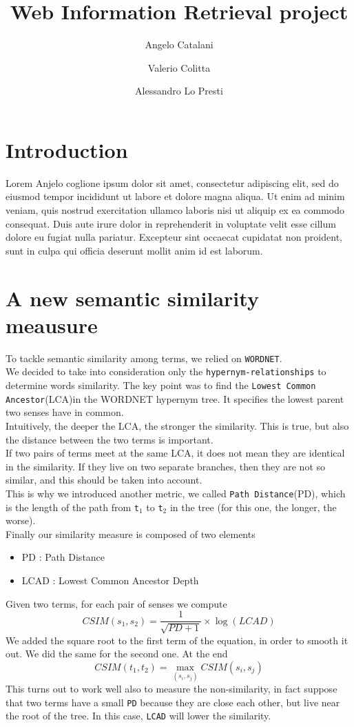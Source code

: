 \documentclass[jou,apacite]{apa6}
\title{Web Information Retrieval project}
\author[1]{Angelo Catalani}
\author[2]{Valerio Colitta}
\author[3]{Alessandro Lo Presti}
\affil[1]{La Sapienza University of Rome}
\affil[2]{La Sapienza University of Rome}
\affil[3]{La Sapienza University of Rome}
\begin{document}
   


\section{Introduction}
Lorem Anjelo coglione ipsum dolor sit amet, consectetur adipiscing elit, sed do eiusmod tempor incididunt ut labore et dolore magna aliqua. Ut enim ad minim veniam, quis nostrud exercitation ullamco laboris nisi ut aliquip ex ea commodo consequat. Duis aute irure dolor in reprehenderit in voluptate velit esse cillum dolore eu fugiat nulla pariatur. Excepteur sint occaecat cupidatat non proident, sunt in culpa qui officia deserunt mollit anim id est laborum.
\section{A new semantic similarity meausure}
To tackle semantic similarity among terms, we relied on \texttt{WORDNET}.\\
We decided to take into consideration only the \texttt{hypernym-relationships} to determine words similarity. The key point was to find the \texttt{Lowest Common Ancestor}(LCA)in the WORDNET hypernym tree. It specifies the lowest parent two senses have in common.\\
Intuitively, the deeper the LCA, the stronger the similarity. This is true, but also the distance between the two terms is important.\\
If two pairs of terms meet at the same LCA, it does not mean they are identical in the similarity. If they live on two separate branches, then they are not so similar, and this should be taken into account.\\
This is why we introduced another metric, we called \texttt{Path Distance}(PD), which is the length of the path from \texttt{t$_1$} to \texttt{t$_2$} in the tree (for this one, the longer, the worse).\\
Finally our similarity measure is composed of two elements
\begin{itemize}
\item PD : Path Distance
\item LCAD : Lowest Common Ancestor Depth
\end{itemize}
Given two terms, for each pair of senses we compute
\begin{equation}
CSIM(s_1,s_2) = \frac{1}{\sqrt{PD+1}} \times \log(LCAD)
\end{equation}
We added the square root to the first term of the equation, in order to smooth it out. We did the same for the second one.
At the end
\begin{equation}
CSIM(t_1,t_2) = \max_{(s_i,s_j)} CSIM(s_i,s_j)
\end{equation}
This turns out to work well also to measure the non-similarity, in fact suppose that two terms have a small \texttt{PD} because they are close each other, but live near the root of the tree. In this case, \texttt{LCAD} will lower the similarity.

\end{document}

